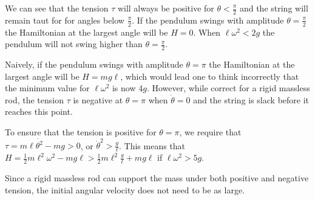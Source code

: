 \documentclass[letterpaper,11pt]{article}
\begin{document}
We can see that the tension $\tau$ will always be positive for $\theta < \frac{\pi}{2}$ and the string will remain taut for for angles below $\frac{\pi}{2}$.  If the pendulum swings with amplitude $\theta = \frac{\pi}{2}$ the Hamiltonian at the largest angle will be $H = 0$.  When $\ell \omega^2 < 2 g$ the pendulum will not swing higher than $\theta = \frac{\pi}{2}$.

Naively, if the pendulum swings with amplitude $\theta = \pi$ the Hamiltonian at the largest angle will be $H = m g \ell$, which would lead one to think incorrectly that the minimum value for $\ell\omega^2$ is now $4 g$.  However, while correct for a rigid massless rod, the tension $\tau$ is negative at $\theta = \pi$ when $\dot{\theta} = 0$ and the string is slack before it reaches this point.

To ensure that the tension is positive for $\theta = \pi$, we require that $\tau = m \ell\dot{\theta^2} - mg > 0$, or $\dot{\theta}^2 > \frac{g}{\ell}$.  This means that $H = \frac{1}{2} m \ell^2 \omega^2 - m g \ell > \frac{1}{2} m \ell^2\frac{g}{\ell} + m g \ell$ if $\ell\omega^2 > 5 g$.

Since a rigid massless rod can support the mass under both positive and negative tension, the initial angular velocity does not need to be as large.
\end{document}
